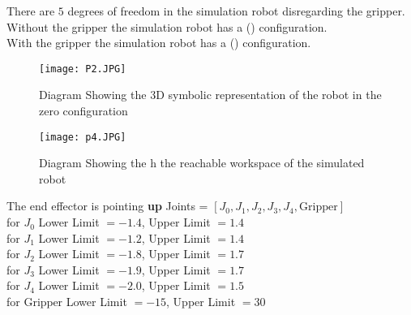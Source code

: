 \documentclass{meam520}
\date{}  %
\date{Due: Monday 1st June 2020}  %
\begin{document}
\maketitle

\hwproblem
There are $5$ degrees of freedom in the simulation robot disregarding the gripper.  
\hwproblem
Without the gripper the simulation robot has a () configuration. \\ 
With the gripper the simulation robot has a () configuration. 


\hwproblem

\renewcommand{\thefigure}{3.1}
\begin{center}
    \begin{figure}[hbt!]
        \centering
        \texttt{[image: P2.JPG]}
         \caption{Diagram Showing the 3D symbolic representation of the robot in the zero configuration }
    \end{figure}
\end{center}


\hwproblem
\renewcommand{\thefigure}{4.1}
\begin{center}
    \begin{figure}[hbt!]
        \centering
        \texttt{[image: p4.JPG]}
         \caption{Diagram Showing the h the reachable workspace of the simulated robot }
    \end{figure}
\end{center}

\hwproblem
The end effector is pointing \textbf{up}
\hwproblem
Joints = $[J_0, J_1, J_2, J_3, J_4, \text{Gripper}]$ \\ 
for $J_0 $ Lower Limit $ = -1.4 $, Upper Limit $ =  1.4 $ \\
for $J_1 $ Lower Limit $ = -1.2 $, Upper Limit $ = 1.4 $ \\
for $J_2 $ Lower Limit $ = -1.8 $, Upper Limit $ =  1.7 $ \\
for $J_3 $ Lower Limit $ =  -1.9 $, Upper   Limit $ = 1.7 $ \\
for $J_4 $ Lower Limit $ =  -2.0 $, Upper Limit $ = 1.5 $ \\
for $\text{Gripper} $ Lower Limit $ =  -15 $, Upper Limit $ = 30 $ \\
\end{document}
